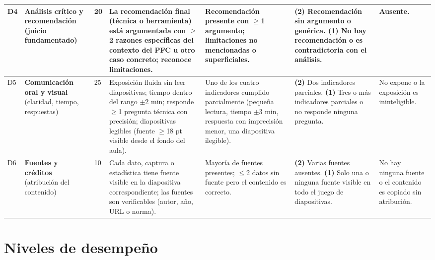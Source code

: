 \documentclass[11pt]{article}
\begin{document}
{\begin{longtable}{|C{0.45cm}|L{2.4cm}|C{0.8cm}|L{3.0cm}|L{3.0cm}|L{3.0cm}|L{2.4cm}|}
	\hline
	 D4 & \textbf{Análisis crítico y recomendación} (juicio fundamentado) & 20 & La recomendación final (técnica o herramienta) está argumentada con $\geq$2 razones específicas del contexto del PFC u otro caso concreto; reconoce limitaciones. & Recomendación presente con $\geq$1 argumento; limitaciones no mencionadas o superficiales. & \textbf{(2)} Recomendación sin argumento o genérica. \textbf{(1)} No hay recomendación o es contradictoria con el análisis. & Ausente.\\
	\hline
	D5 & \textbf{Comunicación oral y visual} (claridad, tiempo, respuestas) & 25 & Exposición fluida sin leer diapositivas; tiempo dentro del rango $\pm$2 min; responde $\geq$1 pregunta técnica con precisión; diapositivas legibles (fuente $\geq$18 pt visible desde el fondo del aula). & Uno de los cuatro indicadores cumplido parcialmente (pequeña lectura, tiempo $\pm$3 min, respuesta con imprecisión menor, una diapositiva ilegible). & \textbf{(2)} Dos indicadores parciales. \textbf{(1)} Tres o más indicadores parciales o no responde ninguna pregunta. & No expone o la exposición es ininteligible.\\
	\hline
	 D6 & \textbf{Fuentes y créditos} (atribución del contenido) & 10 & Cada dato, captura o estadística tiene fuente visible en la diapositiva correspondiente; las fuentes son verificables (autor, año, URL o norma). & Mayoría de fuentes presentes; $\leq$2 datos sin fuente pero el contenido es correcto. & \textbf{(2)} Varias fuentes ausentes. \textbf{(1)} Solo una o ninguna fuente visible en todo el juego de diapositivas. & No hay ninguna fuente o el contenido es copiado sin atribución.\\
	\hline
\end{longtable}
}

\section{\textcolor{utegreendk}{Niveles de desempeño}}\label{sec:niveles}
\end{document}
